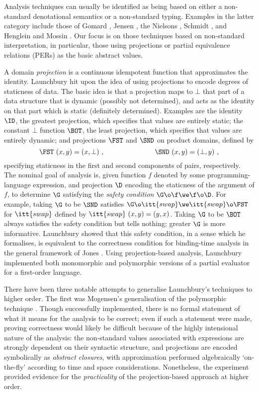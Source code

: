 \begin{article}
Analysis techniques can usually be identified as being based on either
a non-standard denotational semantics or a non-standard typing.
Examples in the latter category include those of Gomard \cite{Go92},
Jensen \cite{Jen92}, the Nielsons \cite{NN88}, Schmidt \cite{Sch88},
and Henglein and Mossin \cite{HM94}.  Our focus is on those techniques
based on non-standard interpretation, in particular, those using
projections or partial equivalence relations (PERs) as the basic
abstract values.

A domain {\it projection\/} is a continuous idempotent function that
approximates the identity.  Launchbury \cite{Lau88} hit upon the idea
of using projections to encode degrees of staticness of data.  The
basic idea is that a projection maps to $\bot$ that part of a data
structure that is dynamic (possibly not determined), and acts as the
identity on that part which is static (definitely determined).
Examples are the identity $\ID$, the greatest projection, which
specifies that values are entirely static; the constant $\bot$
function $\BOT$, the least projection, which specifies that values are
entirely dynamic; and projections $\FST$ and $\SND$ on product
domains, defined by
\[
\FST\ (x,y) = (x,\bot)\ ,\hspace{1.0in} \SND\ (x,y) = (\bot,y)\ ,
\]
specifying staticness in the first and second components of pairs,
respectively.  The nominal goal of analysis is, given function $f$
denoted by some programming-language expression, and projection $\D$
encoding the staticness of the argument of $f$, to determine $\G$
satisfying the {\it safety condition\/} $\G\o\f\we\f\o\D$.  For
example, taking $\G$ to be $\SND$ satisfies
$\G\o\itt{swap}\we\itt{swap}\o\FST$ for $\itt{swap}$ defined by
$\itt{swap}~(x,y)=(y,x)$.  Taking $\G$ to be $\BOT$ always satisfies
the safety condition but tells nothing; greater $\G$ is more
informative.  Launchbury \cite{Lau91a} showed that this safety
condition, in a sense which he formalises, is equivalent
to the correctness condition for binding-time analysis in the general
framework of Jones \cite{Jon88}.  Using projection-based analysis,
Launchbury implemented both monomorphic and polymorphic versions of a
partial evaluator for a first-order language.

There have been three notable attempts to generalise Launchbury's
techniques to higher order.  The first was Mogensen's generalisation
of the polymorphic technique \cite{Mog89}.  Though successfully
implemented, there is no formal statement of what it means for the
analysis to be correct; even if such a statement were made, proving
correctness would likely be difficult because of the highly
intensional nature of the analysis: the non-standard values associated
with expressions are strongly dependent on their syntactic structure,
and projections are encoded symbolically as {\it abstract closures\/},
with approximation performed algebraically `on-the-fly' according to
time and space considerations.  Nonetheless, the experiment provided
evidence for the {\it practicality\/} of the projection-based approach
at higher order.


\end{article}
